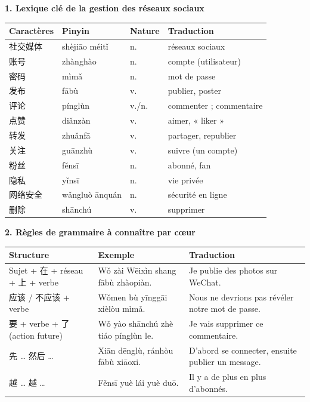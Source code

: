 \documentclass[11pt]{article}
\newcommand{\zh}[1]{\ifmmode\text{#1}\else{#1}\fi}
\begin{document}
\begin{bilan}
\textbf{1. Lexique clé de la gestion des réseaux sociaux}\par
\begin{center}
\begin{tabularx}{\linewidth}{|X|X|X|X|}
\hline
\rowcolor{popblueL} Caractères & Pinyin & Nature & Traduction \\
\hline
社交媒体 & shèjiāo méitǐ & n. & réseaux sociaux \\
\hline
账号 & zhànghào & n. & compte (utilisateur) \\
\hline
密码 & mìmǎ & n. & mot de passe \\
\hline
发布 & fābù & v. & publier, poster \\
\hline
评论 & pínglùn & v./n. & commenter ; commentaire \\
\hline
点赞 & diǎnzàn & v. & aimer, « liker » \\
\hline
转发 & zhuǎnfā & v. & partager, republier \\
\hline
关注 & guānzhù & v. & suivre (un compte) \\
\hline
粉丝 & fěnsī & n. & abonné, fan \\
\hline
隐私 & yǐnsī & n. & vie privée \\
\hline
网络安全 & wǎngluò ānquán & n. & sécurité en ligne \\
\hline
删除 & shānchú & v. & supprimer \\
\hline
\end{tabularx}
\end{center}

\textbf{2. Règles de grammaire à connaître par cœur}\par
\begin{center}
\begin{tabularx}{\linewidth}{|X|X|X|}
\hline
\rowcolor{popblueL} Structure & Exemple & Traduction \\
\hline
Sujet + 在 + réseau + 上 + verbe & \zh{我在微信上发布照片。} Wǒ zài Wēixìn shang fābù zhàopiàn. & Je publie des photos sur WeChat. \\
\hline
应该 / 不应该 + verbe & \zh{我们不应该泄露密码。} Wǒmen bù yīnggāi xièlòu mìmǎ. & Nous ne devrions pas révéler notre mot de passe. \\
\hline
要 + verbe + 了 (action future) & \zh{我要删除这条评论了。} Wǒ yào shānchú zhè tiáo pínglùn le. & Je vais supprimer ce commentaire. \\
\hline
先 … 然后 … & \zh{先登录，然后发布消息。} Xiān dēnglù, ránhòu fābù xiāoxi. & D'abord se connecter, ensuite publier un message. \\
\hline
越 … 越 … & \zh{粉丝越来越多。} Fěnsī yuè lái yuè duō. & Il y a de plus en plus d'abonnés. \\
\hline
\end{tabularx}
\end{center}


\end{bilan}
\end{document}
